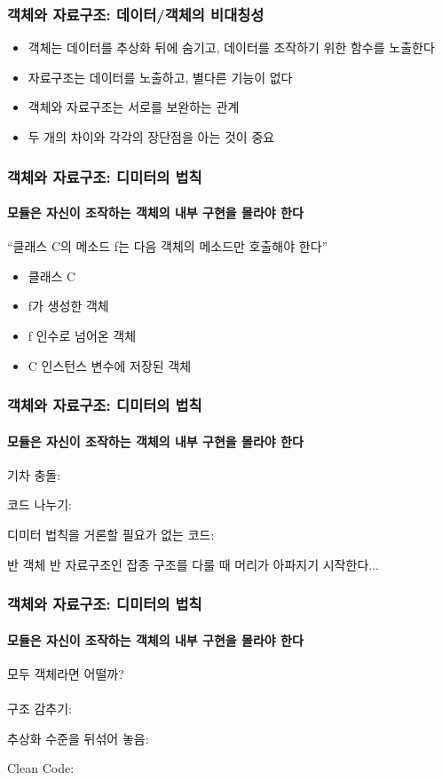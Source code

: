 \documentclass{beamer}
\begin{document}
\begin{frame}
    \frametitle{객체와 자료구조: 데이터/객체의 비대칭성}
    \begin{itemize}
        \item 객체는 데이터를 추상화 뒤에 숨기고, 데이터를 조작하기 위한 함수를 노출한다
        \item 자료구조는 데이터를 노출하고, 별다른 기능이 없다
        \item 객체와 자료구조는 서로를 보완하는 관계
        \item 두 개의 차이와 각각의 장단점을 아는 것이 중요
    \end{itemize}
\end{frame}

\begin{frame}
    \frametitle{객체와 자료구조: 디미터의 법칙}
    \framesubtitle{모듈은 자신이 조작하는 객체의 내부 구현을 몰라야 한다}
    ``클래스 C의 메소드 f는 다음 객체의 메소드만 호출해야 한다''
    \begin{itemize}
        \item 클래스 C
        \item f가 생성한 객체
        \item f 인수로 넘어온 객체
        \item C 인스턴스 변수에 저장된 객체
    \end{itemize}
\end{frame}

\begin{frame}
    \frametitle{객체와 자료구조: 디미터의 법칙}
    \framesubtitle{모듈은 자신이 조작하는 객체의 내부 구현을 몰라야 한다}
    기차 충돌:
    
    코드 나누기:
    
    디미터 법칙을 거론할 필요가 없는 코드:
    
    반 객체 반 자료구조인 잡종 구조를 다룰 때 머리가 아파지기 시작한다...
\end{frame}

\begin{frame}
    \frametitle{객체와 자료구조: 디미터의 법칙}
    \framesubtitle{모듈은 자신이 조작하는 객체의 내부 구현을 몰라야 한다}
    모두 객체라면 어떨까?
    \\~\\
    구조 감추기:
    
    추상화 수준을 뒤섞어 놓음:
    
    Clean Code:
    
\end{frame}
\end{document}
